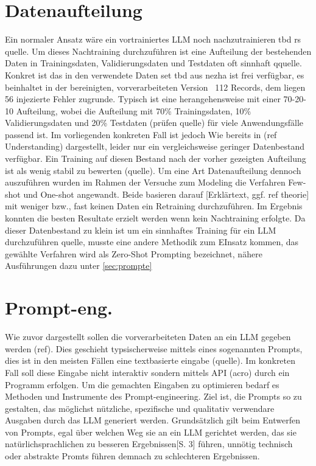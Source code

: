 \section{Datenaufteilung}
\label{sec:datasplit}
Ein normaler Ansatz wäre ein vortrainiertes LLM noch nachzutrainieren tbd rs quelle. Um dieses Nachtraining durchzuführen ist eine Aufteilung der bestehenden Daten in Trainingsdaten, Validierungsdaten und Testdaten oft sinnhaft qquelle. Konkret ist das in den verwendete Daten set tbd aus nezha ist frei verfügbar, es beinhaltet in der bereinigten, vorverarbeiteten Version ~112 Records, dem liegen 56 injezierte Fehler zugrunde. Typisch ist eine herangehensweise mit einer 70-20-10 Aufteilung, wobei die Aufteilung mit 70\% Trainingsdaten, 10\% Validierungsdaten und  20\% Testdaten (prüfen quelle) für viele Anwendungsfälle passend ist. Im vorliegenden konkreten Fall ist jedoch Wie bereits in  (ref Understanding) dargestellt, leider nur ein vergleichsweise geringer Datenbestand verfügbar. Ein Training auf diesen Bestand nach der vorher gezeigten Aufteilung ist als wenig stabil zu bewerten (quelle). Um eine Art Datenaufteilung dennoch auszuführen wurden im Rahmen der Versuche zum Modeling die Verfahren Few-shot und One-shot angewandt. Beide basieren darauf [Erklärtext, ggf. ref theorie] mit weniger bzw., fast keinen Daten ein Retraining durchzuführen. Im Ergebnis konnten die besten Resultate erzielt werden wenn kein Nachtraining erfolgte. Da dieser Datenbestand zu klein ist um ein sinnhaftes Training für ein LLM durchzuführen quelle, musste eine andere Methodik zum EInsatz kommen, das gewählte Verfahren wird als Zero-Shot Prompting bezeichnet, nähere Ausführungen dazu unter \autoref{sec:prompte}
 

\section{Prompt-eng.}
\label{sec:prompte}
Wie zuvor dargestellt sollen die vorverarbeiteten Daten an ein LLM gegeben werden (ref). Dies geschieht typsischerweise mittels eines sogenannten Prompts, dies ist in den meisten Fällen eine textbasierte eingabe (quelle). Im konkreten Fall soll diese Eingabe nicht interaktiv sondern mittels API (acro) durch ein Programm erfolgen. Um die gemachten Eingaben zu optimieren bedarf es Methoden und Instrumente des Prompt-engineering. Ziel ist, die Prompts so zu gestalten, das möglichst nützliche, spezifische und qualitativ verwendare Ausgaben durch das LLM generiert werden. Grundsätzlich gilt beim Entwerfen von Prompts, egal über welchen Weg sie an ein LLM gerichtet werden, das sie natürlichsprachlichen zu besseren Ergebnissen\autocite{Brown2020}[S. 3] führen, unnötig technisch oder abstrakte Promts führen demnach zu schlechteren Ergebnissen. 

